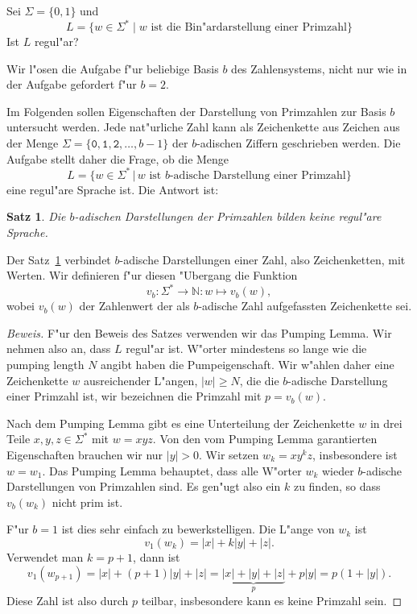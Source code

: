 Sei $\Sigma=\{0,1\}$ und 
\[
L=\{ w\in\Sigma^*\;|\; \text{$w$ ist die Bin"ardarstellung einer Primzahl}\}
\]
Ist $L$ regul"ar?

\begin{loesung}
Wir l"osen die Aufgabe f"ur beliebige Basis $b$ des Zahlensystems, nicht
nur wie in der Aufgabe gefordert f"ur $b=2$.

Im Folgenden sollen Eigenschaften der Darstellung von Primzahlen
zur Basis $b$ untersucht werden.
Jede nat"urliche Zahl kann als Zeichenkette aus Zeichen aus der
Menge $\Sigma=\{\texttt{0},\texttt{1},\texttt{2},\dots, b-1\}$ der $b$-adischen
Ziffern geschrieben werden.
Die Aufgabe stellt daher die Frage, ob die Menge
\[
L=\{ w\in\Sigma^*\,|\,\text{$w$ ist $b$-adische Darstellung einer Primzahl}\}
\]
eine regul"are Sprache ist.
Die Antwort ist:

\newtheorem{satz}{Satz}

\begin{satz}
\label{30000051:satz}
Die $b$-adischen Darstellungen der Primzahlen bilden keine regul"are Sprache.
\end{satz}

Der Satz~\ref{30000051:satz} verbindet $b$-adische Darstellungen einer Zahl,
also Zeichenketten, mit Werten. 
Wir definieren f"ur diesen "Ubergang die Funktion
\[
v_b\colon \Sigma^*\to \mathbb N:w\mapsto v_b(w),
\]
wobei $v_b(w)$ der Zahlenwert der als $b$-adische Zahl aufgefassten
Zeichenkette sei.

\begin{proof}[Beweis]
F"ur den Beweis des Satzes verwenden wir das Pumping Lemma.
Wir nehmen also an, dass $L$ regul"ar ist.
W"orter mindestens so lange wie die pumping length $N$ angibt haben
die Pump\-eigenschaft.
Wir w"ahlen daher eine Zeichenkette $w$ ausreichender L"angen, $|w|\ge N$,
die die $b$-adische Darstellung einer Primzahl ist, wir bezeichnen
die Primzahl mit $p=v_b(w)$.

Nach dem Pumping Lemma gibt es eine Unterteilung der Zeichenkette $w$ in
drei Teile $x,y,z\in\Sigma^*$ mit $w=xyz$.
Von den vom Pumping Lemma garantierten Eigenschaften brauchen wir nur
$|y|>0$.
Wir setzen $w_k=xy^kz$, insbesondere ist $w=w_1$.
Das Pumping Lemma behauptet, dass alle W"orter $w_k$ wieder $b$-adische 
Darstellungen von Primzahlen sind.
Es gen"ugt also ein $k$ zu finden, so dass $v_b(w_k)$ nicht prim ist.

F"ur $b=1$ ist dies sehr einfach zu bewerkstelligen.
Die L"ange von $w_k$ ist
\[
v_1(w_k)=|x| + k|y| + |z|.
\]
Verwendet man $k=p+1$, dann ist
\[
v_1(w_{p+1})
=
|x| + (p+1)|y| + |z|
=
\underbrace{|x| + |y| + |z|}_{p} + p|y|
=
p(1+|y|).
\]
Diese Zahl ist also durch $p$ teilbar, insbesondere kann es keine
Primzahl sein.


\end{proof}
\end{loesung}
